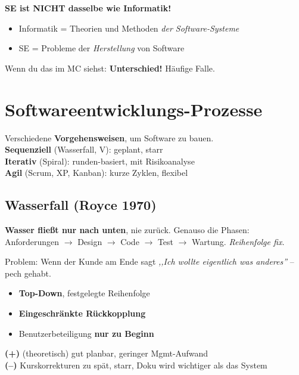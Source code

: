 \documentclass[11pt,a4paper]{article}
\begin{document}
\begin{trap}
\textbf{SE ist NICHT dasselbe wie Informatik!}
\begin{itemize}
  \item Informatik = Theorien und Methoden \emph{der Software-Systeme}
  \item SE = Probleme der \emph{Herstellung} von Software
\end{itemize}
Wenn du das im MC siehst: \textbf{Unterschied!} Häufige Falle.
\end{trap}

\newpage
\section{Softwareentwicklungs-Prozesse}

\begin{tldr}
Verschiedene \textbf{Vorgehensweisen}, um Software zu bauen.\\
\textbf{Sequenziell} (Wasserfall, V): geplant, starr\\
\textbf{Iterativ} (Spiral): runden-basiert, mit Risikoanalyse\\
\textbf{Agil} (Scrum, XP, Kanban): kurze Zyklen, flexibel
\end{tldr}

\subsection{Wasserfall (Royce 1970)}

\begin{story}
\textbf{Wasser fließt nur nach unten}, nie zurück. Genauso die Phasen: Anforderungen $\rightarrow$ Design $\rightarrow$ Code $\rightarrow$ Test $\rightarrow$ Wartung. \emph{Reihenfolge fix.}

Problem: Wenn der Kunde am Ende sagt \emph{,,Ich wollte eigentlich was anderes''} -- pech gehabt.
\end{story}

\begin{keyfacts}
\begin{itemize}
  \item \textbf{Top-Down}, festgelegte Reihenfolge
  \item \textbf{Eingeschränkte Rückkopplung}
  \item Benutzerbeteiligung \textbf{nur zu Beginn}
\end{itemize}
\textbf{(+)} (theoretisch) gut planbar, geringer Mgmt-Aufwand\\
\textbf{(--)} Kurskorrekturen zu spät, starr, Doku wird wichtiger als das System
\end{keyfacts}
\end{document}

